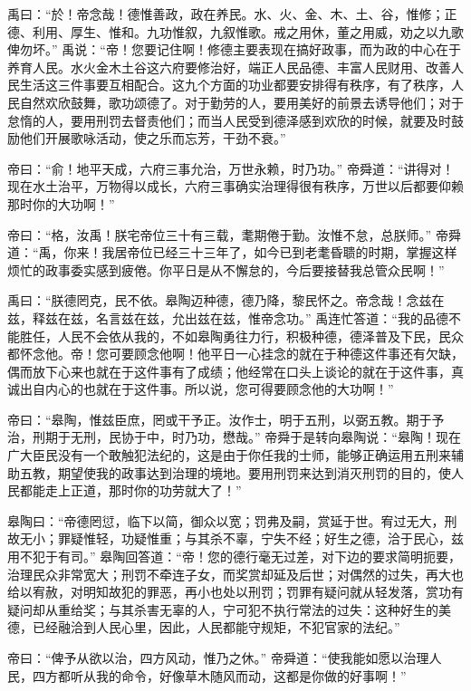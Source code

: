 \documentclass[a4paper,12pt,UTF8,twoside]{ctexbook}
\begin{document}
禹曰：“於！帝念哉！德惟善政，政在养民。水、火、金、木、土、谷，惟修；正德、利用、厚生、惟和。九功惟叙，九叙惟歌。戒之用休，董之用威，劝之以九歌俾勿坏。”
禹说：“帝！您要记住啊！修德主要表现在搞好政事，而为政的中心在于养育人民。水火金木土谷这六府要修治好，端正人民品德、丰富人民财用、改善人民生活这三件事要互相配合。这九个方面的功业都要安排得有秩序，有了秩序，人民自然欢欣鼓舞，歌功颂德了。对于勤劳的人，要用美好的前景去诱导他们；对于怠惰的人，要用刑罚去督责他们；而当人民受到德泽感到欢欣的时候，就要及时鼓励他们开展歌咏活动，使之乐而忘芳，干劲不衰。”

帝曰：“俞！地平天成，六府三事允治，万世永赖，时乃功。”
帝舜道：“讲得对！现在水土治平，万物得以成长，六府三事确实治理得很有秩序，万世以后都要仰赖那时你的大功啊！”

帝曰：“格，汝禹！朕宅帝位三十有三载，耄期倦于勤。汝惟不怠，总朕师。”
帝舜道：“禹，你来！我居帝位已经三十三年了，如今已到老耄昏聩的时期，掌握这样烦忙的政事委实感到疲倦。你平日是从不懈怠的，今后要接替我总管众民啊！”

禹曰：“朕德罔克，民不依。皋陶迈种德，德乃降，黎民怀之。帝念哉！念兹在兹，释兹在兹，名言兹在兹，允出兹在兹，惟帝念功。”
禹连忙答道：“我的品德不能胜任，人民不会依从我的，不如皋陶勇往力行，积极种德，德泽普及下民，民众都怀念他。帝！您可要顾念他啊！他平日一心挂念的就在于种德这件事还有欠缺，偶而放下心来也就在于这件事有了成绩；他经常在口头上谈论的就在于这件事，真诚出自内心的也就在于这件事。所以说，您可得要顾念他的大功啊！”

帝曰：“皋陶，惟兹臣庶，罔或干予正。汝作士，明于五刑，以弼五教。期于予治，刑期于无刑，民协于中，时乃功，懋哉。”
帝舜于是转向皋陶说：“皋陶！现在广大臣民没有一个敢触犯法纪的，这是由于你任我的士师，能够正确运用五刑来辅助五教，期望使我的政事达到治理的境地。要用刑罚来达到消灭刑罚的目的，使人民都能走上正道，那时你的功劳就大了！”

皋陶曰：“帝德罔愆，临下以简，御众以宽；罚弗及嗣，赏延于世。宥过无大，刑故无小；罪疑惟轻，功疑惟重；与其杀不辜，宁失不经；好生之德，洽于民心，兹用不犯于有司。”
皋陶回答道：“帝！您的德行毫无过差，对下边的要求简明扼要，治理民众非常宽大；刑罚不牵连子女，而奖赏却延及后世；对偶然的过失，再大也给以宥赦，对明知故犯的罪恶，再小也处以刑罚；罚罪有疑问就从轻发落，赏功有疑问却从重给奖；与其杀害无辜的人，宁可犯不执行常法的过失：这种好生的美德，已经融洽到人民心里，因此，人民都能守规矩，不犯官家的法纪。”

帝曰：“俾予从欲以治，四方风动，惟乃之休。”
帝舜道：“使我能如愿以治理人民，四方都听从我的命令，好像草木随风而动，这都是你做的好事啊！”
\end{document}
